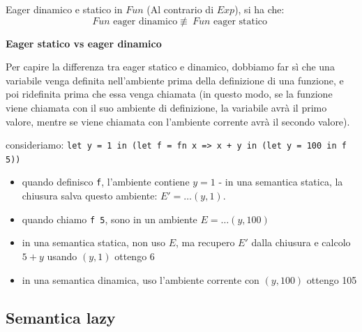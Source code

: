 \documentclass[a4paper,11pt]{report}
\begin{document}
\begin{lemmaframe}{Eager dinamico e statico in \( Fun \)}{}
    (Al contrario di \( Exp \)), si ha che:
    \[ Fun \text{ eager dinamico} \not\equiv \ Fun \text{ eager statico } \]
\end{lemmaframe}

\textbf{Eager statico vs eager dinamico}

Per capire la differenza tra eager statico e dinamico, dobbiamo far sì che una variabile venga definita nell'ambiente prima della definizione di una funzione, e poi ridefinita prima che essa venga chiamata (in questo modo, se la funzione viene chiamata con il suo ambiente di definizione, la variabile avrà il primo valore, mentre se viene chiamata con l'ambiente corrente avrà il secondo valore).

consideriamo: \texttt{let y = 1 in (let f = fn x => x + y in (let y = 100 in f 5))}
\begin{itemize}
    \item quando definisco \texttt{f}, l'ambiente contiene \( y=1 \) - in una semantica statica, la chiusura salva questo ambiente: \( E' = \dots (y, 1) \).
    \item quando chiamo \texttt{f 5}, sono in un ambiente \( E = \dots(y, 100)\)
    \item in una semantica statica, non uso \( E \), ma recupero \( E' \) dalla chiusura e calcolo \( 5 + y \) usando \( (y, 1)\)
        \subitem ottengo \( 6 \)    
    \item in una semantica dinamica, uso l'ambiente corrente con \( (y, 100) \) 
        \subitem ottengo 105
\end{itemize}

\subsection{Semantica lazy}
\end{document}
